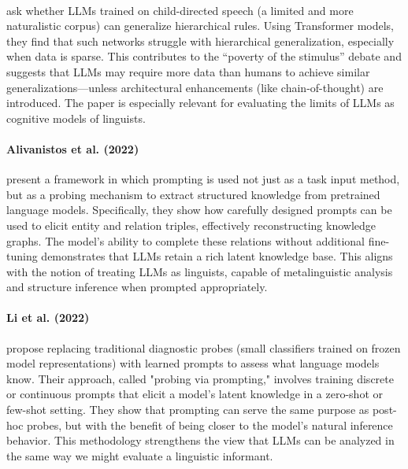 \paragraph{} \citet{yedetore2023stimulus} ask whether LLMs trained on child-directed speech (a limited and more naturalistic corpus) can generalize hierarchical rules. Using Transformer models, they find that such networks struggle with hierarchical generalization, especially when data is sparse. This contributes to the ``poverty of the stimulus'' debate and suggests that LLMs may require more data than humans to achieve similar generalizations---unless architectural enhancements (like chain-of-thought) are introduced. The paper is especially relevant for evaluating the limits of LLMs as cognitive models of linguists.

\paragraph{Alivanistos et al. (2022)}
\citet{alivanistos2022prompting} present a framework in which prompting is used not just as a task input method, but as a probing mechanism to extract structured knowledge from pretrained language models. Specifically, they show how carefully designed prompts can be used to elicit entity and relation triples, effectively reconstructing knowledge graphs. The model's ability to complete these relations without additional fine-tuning demonstrates that LLMs retain a rich latent knowledge base. This aligns with the notion of treating LLMs as linguists, capable of metalinguistic analysis and structure inference when prompted appropriately.

\paragraph{Li et al. (2022)}
\citet{li2022probing} propose replacing traditional diagnostic probes (small classifiers trained on frozen model representations) with learned prompts to assess what language models know. Their approach, called "probing via prompting," involves training discrete or continuous prompts that elicit a model's latent knowledge in a zero-shot or few-shot setting. They show that prompting can serve the same purpose as post-hoc probes, but with the benefit of being closer to the model's natural inference behavior. This methodology strengthens the view that LLMs can be analyzed in the same way we might evaluate a linguistic informant.

